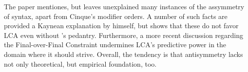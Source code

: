 \documentclass[a4paper, 12pt]{article}
\begin{document}
\begin{sloppypar}
The paper mentiones, but leaves unexplained many instances of the assymmetry of syntax, apart from Cinque's modifier orders. A number of such facts are provided a Kaynean explanation by \textcite{kayne2005} himself, but \textcite{tonoike2007japanesesymmetrysyntax} shows that these do not favor LCA even without 's pedantry. Furthermore, a more recent discussion \parencite{zeijlstra2023} regarding the Final-over-Final Constraint \parencite{biberauer2014} undermines LCA's predictive power in the domain where it should strive. Overall, the tendency is that antisymmetry lacks not only theoretical, but empirical foundation, too.


% 
\printbibliography

\end{sloppypar}
\end{document}
